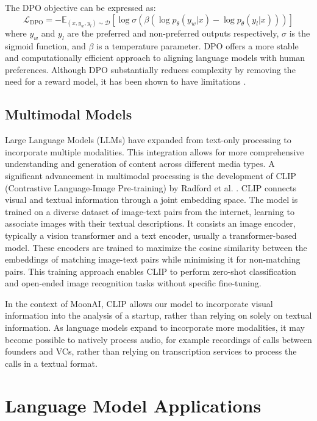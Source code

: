 \documentclass[a4paper, oneside]{discothesis}
\begin{document}
The DPO objective can be expressed as:
\[\mathcal{L}_{\text{DPO}} = -\mathbb{E}_{(x,y_w,y_l)\sim \mathcal{D}}[\log \sigma(\beta(\log p_\theta(y_w|x) - \log p_\theta(y_l|x)))]\]
where $y_w$ and $y_l$ are the preferred and non-preferred outputs respectively, $\sigma$ is the sigmoid function, and $\beta$ is a temperature parameter. DPO offers a more stable and computationally efficient approach to aligning language models with human preferences. Although DPO substantially reduces complexity by removing the need for a reward model, it has been shown to have limitations \cite{dposuperiortoppo_xu}.


\subsection{Multimodal Models}
Large Language Models (LLMs) have expanded from text-only processing to incorporate multiple modalities. This integration allows for more comprehensive understanding and generation of content across different media types. A significant advancement in multimodal processing is the development of CLIP (Contrastive Language-Image Pre-training) by Radford et al. \cite{radford2021cliplearning}. CLIP connects visual and textual information through a joint embedding space. The model is trained on a diverse dataset of image-text pairs from the internet, learning to associate images with their textual descriptions. It consists an image encoder, typically a vision transformer and a text encoder, usually a transformer-based model. These encoders are trained to maximize the cosine similarity between the embeddings of matching image-text pairs while minimising it for non-matching pairs. This training approach enables CLIP to perform zero-shot classification and open-ended image recognition tasks without specific fine-tuning.

In the context of MoonAI, CLIP allows our model to incorporate visual information into the analysis of a startup, rather than relying on solely on textual information. As language models expand to incorporate more modalities, it may become possible to natively process audio, for example recordings of calls between founders and VCs, rather than relying on transcription services to process the calls in a textual format. 

\section{Language Model Applications}
\end{document}
